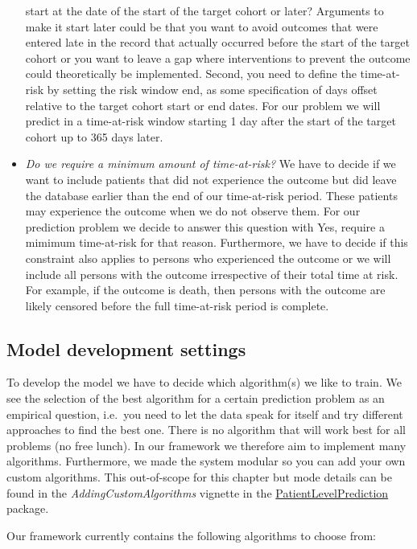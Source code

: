 \documentclass[11pt]{book}
\begin{document}
\begin{itemize}
  start at the date of the start of the target cohort or later?
  Arguments to make it start later could be that you want to avoid
  outcomes that were entered late in the record that actually occurred
  before the start of the target cohort or you want to leave a gap where
  interventions to prevent the outcome could theoretically be
  implemented. Second, you need to define the time-at-risk by setting
  the risk window end, as some specification of days offset relative to
  the target cohort start or end dates. For our problem we will predict
  in a time-at-risk window starting 1 day after the start of the target
  cohort up to 365 days later.
\item
  \emph{Do we require a minimum amount of time-at-risk?} We have to
  decide if we want to include patients that did not experience the
  outcome but did leave the database earlier than the end of our
  time-at-risk period. These patients may experience the outcome when we
  do not observe them. For our prediction problem we decide to answer
  this question with Yes, require a mimimum time-at-risk for that
  reason. Furthermore, we have to decide if this constraint also applies
  to persons who experienced the outcome or we will include all persons
  with the outcome irrespective of their total time at risk. For
  example, if the outcome is death, then persons with the outcome are
  likely censored before the full time-at-risk period is complete.
\end{itemize}

\subsection{Model development
settings}\label{model-development-settings}

To develop the model we have to decide which algorithm(s) we like to
train. We see the selection of the best algorithm for a certain
prediction problem as an empirical question, i.e.~you need to let the
data speak for itself and try different approaches to find the best one.
There is no algorithm that will work best for all problems (no free
lunch). In our framework we therefore aim to implement many algorithms.
Furthermore, we made the system modular so you can add your own custom
algorithms. This out-of-scope for this chapter but mode details can be
found in the \emph{AddingCustomAlgorithms} vignette in the
\href{https://ohdsi.github.io/PatientLevelPrediction/}{PatientLevelPrediction}
package.

Our framework currently contains the following algorithms to choose
from:
\end{document}
